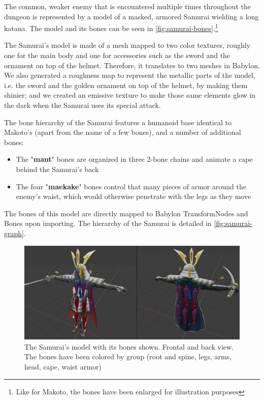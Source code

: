 The common, weaker enemy that is encountered multiple times throughout the dungeon is represented by a model of a masked, armored Samurai wielding a long katana. The model and its bones can be seen in \autoref*{fig:samurai-bones}.\footnote{Like for Makoto, the bones have been enlarged for illustration purposes}

The Samurai's model is made of a mesh mapped to two color textures, roughly one for the main body and one for accessories such as the sword and the ornament on top of the helmet. Therefore, it translates to two meshes in Babylon. We also generated a roughness map to represent the metallic parts of the model, i.e. the sword and the golden ornament on top of the helmet, by making them shinier; and we created an emissive texture to make those same elements glow in the dark when the Samurai uses its special attack.

The bone hierarchy of the Samurai features a humanoid base identical to Makoto's (apart from the name of a few bones), and a number of additional bones:

\begin{itemize}
    \item The "\textbf{mant}" bones are organized in three 2-bone chains and animate a cape behind the Samurai's back
    \item The four "\textbf{maekake}" bones control that many pieces of armor around the enemy's waist, which would otherwise penetrate with the legs as they move
\end{itemize}

The bones of this model are directly mapped to Babylon TransformNodes and Bones upon importing. The hierarchy of the Samurai is detailed in \autoref*{fig:samurai-graph}.

\begin{figure}[H]
    \centering
    \includegraphics[width=1\textwidth]{images/ch3/Samurai-Bones.png}
    \caption{The Samurai's model with its bones shown. Frontal and back view. The bones have been colored by group (root and spine, legs, arms, head, cape, waist armor)}
    \label{fig:samurai-bones}
\end{figure}

